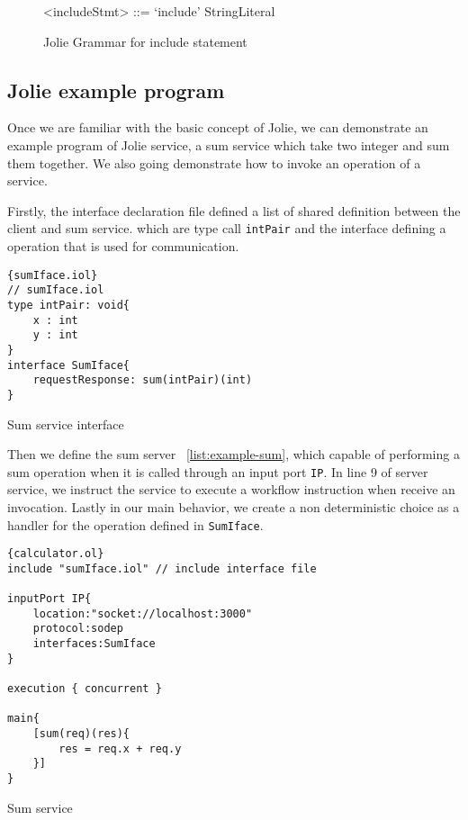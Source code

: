 \begin{figure}[h]
    \begin{framed}
        \begin{grammar}
            <includeStmt> ::= `include' StringLiteral
        \end{grammar}
    \end{framed}
    \caption{Jolie Grammar for include statement}
    \label{fig:jolie-definition}
\end{figure}

\subsection{Jolie example program}

Once we are familiar with the basic concept of Jolie, we can demonstrate an example program of Jolie service, a sum service which take two integer and sum them together. We also going demonstrate how to invoke an operation of a service.

Firstly, the interface declaration file defined a list of shared definition between the client and sum service. which are type call \texttt{intPair} and the interface defining a operation that is used for communication.

\begin{listing}[ht]
\lstset{language=Jolie,
    style=codeStyle
}
\begin{lstlisting}[frame=tlrb]{sumIface.iol}
// sumIface.iol
type intPair: void{
    x : int
    y : int
}
interface SumIface{
    requestResponse: sum(intPair)(int)
}
\end{lstlisting}
\caption{Sum service interface}
\label{list:example-iol}
\end{listing}

Then we define the sum server ~\ref{list:example-sum}, which capable of performing a sum operation when it is called through an input port \texttt{IP}. In line 9 of server service, we instruct the service to execute a workflow instruction when receive an invocation. Lastly in our main behavior, we create a non deterministic choice as a handler for the operation defined in \texttt{SumIface}.

\begin{listing}
\lstset{language=Jolie,
    style=codeStyle,
    numbers=left,
    firstnumber=1
}
\begin{lstlisting}[frame=tlrb]{calculator.ol}
include "sumIface.iol" // include interface file

inputPort IP{
    location:"socket://localhost:3000"
    protocol:sodep 
    interfaces:SumIface
}

execution { concurrent }

main{
    [sum(req)(res){
        res = req.x + req.y
    }]
}
\end{lstlisting}
    \caption{Sum service}
    \label{list:example-sum}
\end{listing}

